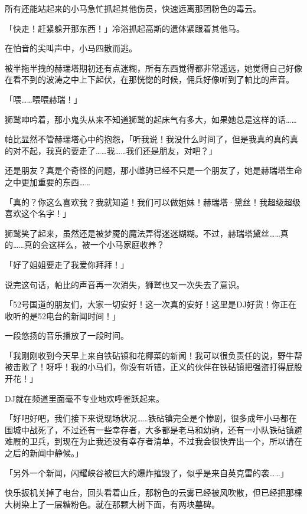 所有还能站起来的小马急忙抓起其他伤员，快速远离那团粉色的毒云。

「快走！赶紧躲开那东西！」冷浴抓起高斯的遗体紧跟着其他马。

在怕音的尖叫声中，小马四散而逃。

被半拖半拽的赫瑞塔期初还有点迷糊，所有东西觉得都非常遥远，她觉得自己好像在看不到的波涛之中上下起伏，在那恍惚的时候，佣兵好像听到了帕比的声音。

「喂……喂喂赫瑞！」

狮鹫呻吟着，那小鬼头从来不知道狮鹫的起床气有多大，如果她总是这样的话……{}

帕比显然不管赫瑞塔心中的抱怨，「听我说！我没什么时间了，但是我真的真的真的对不起，我真的要走了……我……我们还是朋友，对吧？」

还是朋友？真是个奇怪的问题，那小雌驹已经不只是一个朋友了，她是赫瑞塔生命之中更加重要的东西……

「真的？你这么喜欢我？我就知道！我们可以做姐妹！赫瑞塔·黛丝！我超级超级喜欢这个名字！」

狮鹫笑了起来，虽然还是被梦魇的魔法弄得迷迷糊糊。不过，赫瑞塔黛丝……真的……真的会这样么，被一个小马家庭收养？

「好了姐姐要走了我爱你拜拜！」

说完这句话，帕比的声音再一次消失，狮鹫也又一次失去了意识。

\horizonline


「{\rt 52号国道的朋友们，大家一切安好！这一次真的安好！这里是DJ好货！你正在收听的是52电台的新闻时间！}」

一段悠扬的音乐播放了一段时间。

「{\rt 我刚刚收到今天早上来自铁砧镇和花椰菜的新闻！我可以很负责任的说，野牛帮被击败了！呀呼！我的小马们，你没有听错，正义的伙伴在铁砧镇把强盗打得屁股开花！}」

DJ就在频道里面毫不专业地欢呼雀跃起来。

「{\rt 好吧好吧，我们接下来说现场状况……铁砧镇完全是个惨剧，很多成年小马都在围城中战死了，不过还有一些幸存者，大多都是老马和幼驹，还有一小队铁砧镇避难厩的卫兵，到现在为止我还没有幸存者清单，不过我会很快弄出一个，所以请在之后的新闻中静候。}」

「{\rt 另外一个新闻，闪耀峡谷被巨大的爆炸摧毁了，似乎是来自英克雷的袭……}」

快乐扳机关掉了电台，回头看着山丘，那粉色的云雾已经被风吹散，但已经把那棵大树染上了一层糖粉色。就在那颗大树下面，有两块墓碑。

